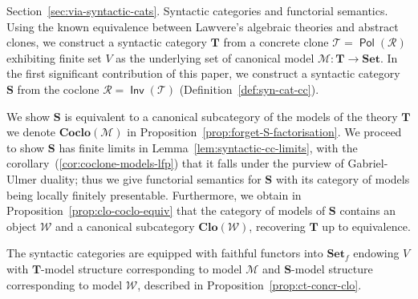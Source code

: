 \documentclass[11pt, a4paper, twoside,leqno]{amsart}
\newcommand{\cat}[1]{\mathbf{#1}}
\numberwithin{equation}{section}
\theoremstyle{plain}
\theoremstyle{definition}
\newcommand{\Set}{\cat{Set}}
\DeclareMathOperator{\Pol}{\mathsf{Pol}}
\DeclareMathOperator{\Inv}{\mathsf{Inv}}
\begin{document}
  Section~\ref{sec:via-syntactic-cats}.
  Syntactic categories and functorial semantics.
      Using the known equivalence between Lawvere's algebraic theories and
    abstract clones, we construct a syntactic category \(\cat{T}\)
    from a concrete clone \(\mathscr{T} = \Pol(\mathscr{R}
  )
  \) exhibiting finite set \(V\) as the underlying set of canonical
  model \(\mathcal{M} \colon \cat{T} \rightarrow \Set\).
    In the first significant
  contribution of this paper, we construct a
  syntactic category \(\cat{S}\) from the coclone \(\mathscr{R}= \Inv(\mathscr{T}
  )\) (Definition~\ref{def:syn-cat-cc}).
  
  We show \(\cat{S}\) is equivalent to a canonical subcategory
  of the models of the theory \(\cat{T}\) we denote
  \(\cat{Coclo}(\mathcal{M})\) in
  Proposition~\ref{prop:forget-S-factorisation}.
    We proceed to show \(\cat{S}\) has finite limits in
    Lemma~\ref{lem:syntactic-cc-limits},  with the
    corollary~(\ref{cor:coclone-models-lfp})
that it falls under the purview of Gabriel-Ulmer duality; thus we give
functorial semantics for \(\cat{S}\) with its category of models being
locally finitely presentable. Furthermore, we obtain in
Proposition~\ref{prop:clo-coclo-equiv} that the category of models of \(\cat{S}\)
contains an object
\(\mathcal{W}\) and a canonical subcategory \(\cat{Clo}(\mathcal{W})\), recovering \(\cat{T}\) up to equivalence.

  The syntactic categories are equipped with faithful functors into
  \(\cat{Set}_{f}\) endowing \(V\) with \(\cat{T}\)-model structure
  corresponding to model \(\mathcal{M}\) and
  \(\cat{S}\)-model structure corresponding to model \(\mathcal{W}\),
  described in Proposition~\ref{prop:ct-concr-clo}.


     
\end{document}
